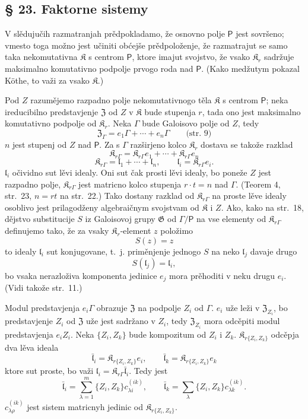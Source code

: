 \documentclass[11pt]{article}
\begin{document}
\subsection*{§ 23. Faktorne sistemy}\label{faktorensysteme}

V slědujučih razmatranjah prědpokladamo, že osnovno polje \(\mathsf P\) jest sovršeno; vmesto toga možno jest učiniti obćejše prědpoloženje, že razmatrajut se samo taka nekomutativna \(\mathfrak K\) s centrom \(\mathsf P\), ktore imajut svojstvo, že vsako \(\mathfrak K_r\) sadržuje maksimalno komutativno podpolje prvogo roda nad \(\mathsf P\). (Kako medžutym pokazal Köthe, to važi za vsako \(\mathfrak K\).)

Pod \(Z\) razumějemo razpadno polje nekomutativnogo těla \(\mathfrak K\) s centrom \(\mathsf P\); neka ireducibilno predstavjenje \(\mathfrak Z\) od \(Z\) v \(\mathfrak K\) bude stupenja \(r\), tada ono jest maksimalno komutativno podpolje od \(\mathfrak K_r\). Neka \(\Gamma\) bude Galoisovo polje od \(Z\), tedy
\[
\mathfrak Z_\Gamma=e_1\Gamma+\cdots+e_n\Gamma
\qquad\text{(str.~9)}
\]
\(n\) jest stupenj od \(Z\) nad \(\mathsf P\). Za s \(\Gamma\) razširjeno kolco \(\mathfrak K_r\) dostava se takože razklad
\[
\mathfrak K_{r\Gamma}=\mathfrak K_{r\Gamma}e_1+\cdots+\mathfrak K_{r\Gamma}e_n
\]
\[
\mathfrak K_{r\Gamma}=\mathfrak l_1+\cdots+\mathfrak l_n,\qquad
\mathfrak l_i=\mathfrak K_{r\Gamma}e_i.
\]
\(\mathfrak l_i\) očividno sut lěvi idealy. Oni sut čak prosti lěvi idealy, bo poneže \(Z\) jest razpadno polje, \(\mathfrak K_{r\Gamma}\) jest matricno kolco stupenja \(r\cdot t=n\) nad \(\Gamma\). (Teorem 4, str.~23, \(n=rt\) na str.~22.) Tako dostany razklad od \(\mathfrak K_{r\Gamma}\) na proste lěve idealy osoblivo jest prilagodženy algebraičnym svojstvam od \(\mathfrak K\) i \(Z\). Ako, kako na str.~18, dějstvo substitucije \(S\) iz Galoisovoj grupy \(\mathfrak G\) od \(\Gamma/\mathsf P\) na vse elementy od \(\mathfrak K_{r\Gamma}\) definujemo tako, že za vsaky \(\mathfrak K_r\)-element \(z\) položimo
\[
S(z)=z
\]
to idealy \(\mathfrak l_i\) sut konjugovane, t.~j. priměnjenje jednogo \(S\) na neko \(\mathfrak l_j\) davaje drugo
\[
S(\mathfrak l_j)=\mathfrak l_i,
\]
bo vsaka nerazloživa komponenta jedinice \(e_j\) mora prěhoditi v neku drugu \(e_i\). (Vidi takože str.~11.)

Modul predstavjenja \(e_i\Gamma\) obrazuje \(\mathfrak Z\) na podpolje \(Z_i\) od \(\Gamma\). \(e_i\) uže leži v \(\mathfrak Z_{Z_i}\), bo predstavjenje \(Z_i\) od \(\mathfrak Z\) uže jest sadržano v \(Z_i\), tedy \(\mathfrak Z_{Z_i}\) mora odcěpiti modul predstavjenja \(e_iZ_i\). Neka \(\{Z_i,Z_k\}\) bude kompozitum od \(Z_i\) i \(Z_k\). \(\mathfrak K_{r\{Z_i,Z_k\}}\) odcěpja dva lěva ideala
\[
\bar{\mathfrak l}_i=\mathfrak K_{r\{Z_i,Z_k\}}e_i,\qquad
\bar{\mathfrak l}_k=\mathfrak K_{r\{Z_i,Z_k\}}e_k
\]
ktore sut proste, bo važi \(\mathfrak l_i=\mathfrak K_{r\Gamma}\bar{\mathfrak l}_i\). Tedy jest
\[
\bar{\mathfrak l}_i=\sum_{\lambda=1}^m\{Z_i,Z_k\}c_{\lambda i}^{(ik)},\qquad
\bar{\mathfrak l}_k=\sum_{\lambda}\{Z_i,Z_k\}c_{\lambda k}^{(ik)}.
\]
\(c_{\lambda\rho}^{(ik)}\) jest sistem matricnyh jedinic od \(\mathfrak K_{r\{Z_i,Z_k\}}\).
\end{document}

